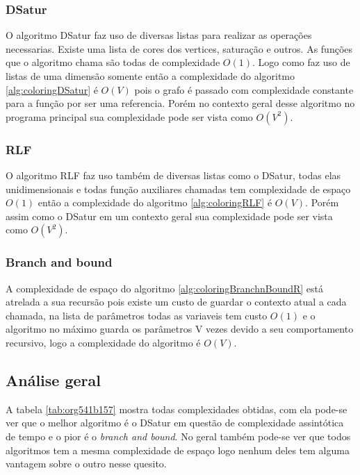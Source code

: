 \documentclass[12pt]{article}
\begin{document}
\subsubsection{DSatur}
\label{sec:org30bc95f}
O algoritmo DSatur faz uso de diversas listas para realizar as operações necessarias. Existe uma lista de cores dos vertices, saturação e outros. As funções que o algoritmo chama são todas de complexidade \(O(1)\). Logo como faz uso de listas de uma dimensão somente então a complexidade do algoritmo \ref{alg:coloringDSatur} é \(O(V)\) pois o grafo é passado com complexidade constante para a função por ser uma referencia. Porém no contexto geral desse algoritmo no programa principal sua complexidade pode ser vista como \(O(V^2)\).

\subsubsection{RLF}
\label{sec:orge540cfc}
O algoritmo RLF faz uso também de diversas listas como o DSatur, todas elas unidimensionais e todas função auxiliares chamadas tem complexidade de espaço \(O(1)\) então a complexidade do algoritmo \ref{alg:coloringRLF} é \(O(V)\). Porém assim como o DSatur em um contexto geral sua complexidade pode ser vista como \(O(V^2)\).

\subsubsection{Branch and bound}
\label{sec:orgd4f917d}

A complexidade de espaço do algoritmo \ref{alg:coloringBranchnBoundR} está atrelada a sua recursão pois existe um custo de guardar o contexto atual a cada chamada, na lista de parâmetros todas as variaveis tem custo \(O(1)\) e o algoritmo no máximo guarda os parâmetros V vezes devido a seu comportamento recursivo, logo a complexidade do algoritmo é \(O(V)\).

\subsection{Análise geral}
\label{sec:orgd7b1c3c}

A tabela \ref{tab:org541b157} mostra todas complexidades obtidas, com ela pode-se ver que o melhor algoritmo é o DSatur em questão de complexidade assintótica de tempo e o pior é o \emph{branch and bound}. No geral também pode-se ver que todos algoritmos tem a mesma complexidade de espaço logo nenhum deles tem alguma vantagem sobre o outro nesse quesito.
\end{document}
